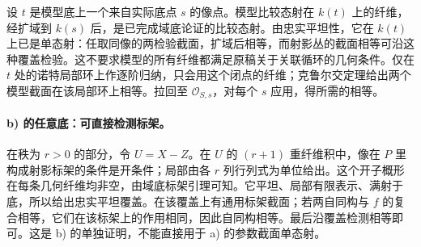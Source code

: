 \documentclass[openany,fontset=fandol]{ctexbook}
\newcommand{\OO}{\mathcal O}
\begin{document}
设 \(t\) 是模型底上一个来自实际底点 \(s\) 的像点。模型比较态射在 \(k(t)\) 上的纤维，经扩域到 \(k(s)\) 后，是已完成域底论证的比较态射。由忠实平坦性，它在 \(k(t)\) 上已是单态射：任取同像的两检验截面，扩域后相等，而射影丛的截面相等可沿这种覆盖检验。这不要求模型的所有纤维都满足原稿关于关联循环的几何条件。仅在 \(t\) 处的诺特局部环上作逐阶归纳，只会用这个闭点的纤维；克鲁尔交定理给出两个模型截面在该局部环上相等。拉回至 \(\OO_{S,s}\)，对每个 \(s\) 应用，得所需的相等。

\paragraph{b) 的任意底：可直接检测标架。}
在秩为 \(r>0\) 的部分，令 \(U=X-Z\)。在 \(U\) 的 \((r+1)\) 重纤维积中，像在 \(P\) 里构成射影标架的条件是开条件；局部由各 \(r\) 列行列式为单位给出。这个开子概形在每条几何纤维均非空，由域底标架引理可知。它平坦、局部有限表示、满射于底，所以给出忠实平坦覆盖。在该覆盖上有通用标架截面；若两自同构与 \(f\) 的复合相等，它们在该标架上的作用相同，因此自同构相等。最后沿覆盖检测相等即可。这是 b) 的单独证明，不能直接用于 a) 的参数截面单态射。
\end{document}
